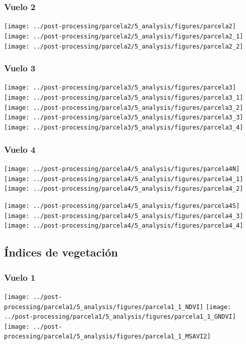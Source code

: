 \documentclass[spanish,openany]{article}
\begin{document}
\subsubsection{Vuelo 2}\label{vuelo-2}

\texttt{[image: ../post-processing/parcela2/5\_analysis/figures/parcela2]}
\texttt{[image: ../post-processing/parcela2/5\_analysis/figures/parcela2\_1]}
\texttt{[image: ../post-processing/parcela2/5\_analysis/figures/parcela2\_2]}

\subsubsection{Vuelo 3}\label{vuelo-3}

\texttt{[image: ../post-processing/parcela3/5\_analysis/figures/parcela3]}
\texttt{[image: ../post-processing/parcela3/5\_analysis/figures/parcela3\_1]}
\texttt{[image: ../post-processing/parcela3/5\_analysis/figures/parcela3\_2]}
\texttt{[image: ../post-processing/parcela3/5\_analysis/figures/parcela3\_3]}
\texttt{[image: ../post-processing/parcela3/5\_analysis/figures/parcela3\_4]}

\subsubsection{Vuelo 4}\label{vuelo-4}

\texttt{[image: ../post-processing/parcela4/5\_analysis/figures/parcela4N]}
\texttt{[image: ../post-processing/parcela4/5\_analysis/figures/parcela4\_1]}
\texttt{[image: ../post-processing/parcela4/5\_analysis/figures/parcela4\_2]}

\texttt{[image: ../post-processing/parcela4/5\_analysis/figures/parcela4S]}
\texttt{[image: ../post-processing/parcela4/5\_analysis/figures/parcela4\_3]}
\texttt{[image: ../post-processing/parcela4/5\_analysis/figures/parcela4\_4]}

\subsection{Índices de vegetación}\label{indices-de-vegetacion-2}

\subsubsection{Vuelo 1}\label{vuelo-1-1}

\texttt{[image: ../post-processing/parcela1/5\_analysis/figures/parcela1\_1\_NDVI]}
\texttt{[image: ../post-processing/parcela1/5\_analysis/figures/parcela1\_1\_GNDVI]}
\texttt{[image: ../post-processing/parcela1/5\_analysis/figures/parcela1\_1\_MSAVI2]}
\end{document}
